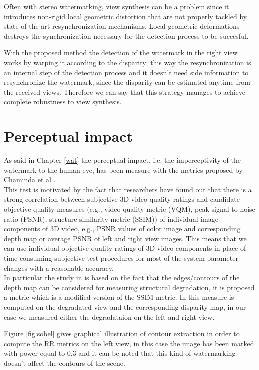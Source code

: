 Often with stereo watermarking, view synthesis can be a problem since it introduces non-rigid local geometric distortion that are not properly tackled by state-of-the art resynchronization mechanisms. Local geometric deformations destroys the synchronization necessary for the detection process to be succesful.

With the proposed method the detection of the watermark in the right view works by warping it according to the disparity; this way the resynchronization is an internal step of the detection process and it doesn't need side information to resynchronize the watermark, since the disparity can be estimated anytime from the received views.
\newline Therefore we can say that this strategy manages to achieve complete robustness to view synthesis.
\clearpage
\section{Perceptual impact}

As said in Chapter \ref{wat} the perceptual impact, i.e. the imperceptivity of the watermark to the human eye, has been measure with the metrics proposed by Chaminda et al \cite{QMETRICS}.\\ 
This test is motivated by the fact that researchers have found out that there is a strong correlation between subjective 3D video quality ratings and candidate objective quality measures (e.g., video quality metric (VQM), peak-signal-to-noise ratio (PSNR), structure similarity metric (SSIM)) of individual image components of 3D video, e.g., PSNR values of color image and corresponding depth map or average PSNR of left and right view images. This means that we can use individual objective quality ratings of 3D video components in place of time consuming subjective test procedures for most of the system parameter changes with a reasonable accuracy.\\
In particular the study in \cite{QMETRICS} is based on the fact that the edges/contours of the depth map can be considered for measuring structural degradation, it is proposed a metric which is a modified version of the SSIM metric. In  \cite{QMETRICS} this measure is computed on the degradated view and the corresponding disparity map, in our case we measured either the degradataion on the left and right view.

Figure \ref{fig:sobel} gives graphical illustration of contour extraction in order to compute the RR metrics on the left view, in this case the image has been marked with power equal to 0.3 and it can be noted that this kind of watermarking doesn't affect the contours of the scene.
   
